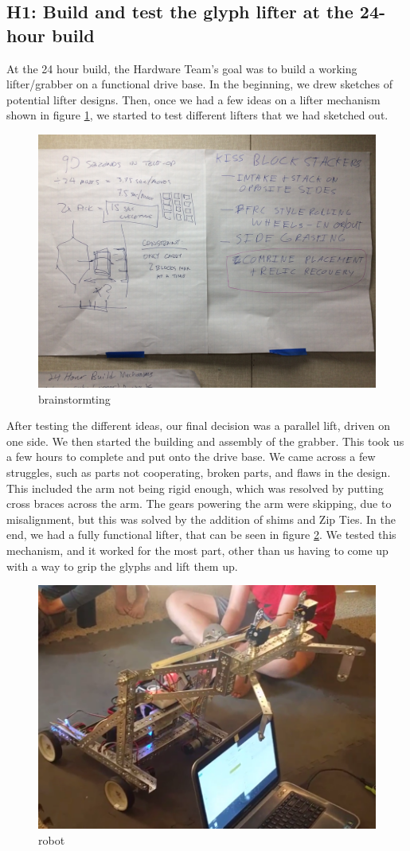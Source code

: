\documentclass{article}
\begin{document}
\subsection{H1: Build and test the glyph lifter at the 24-hour build}

At the 24 hour build, the Hardware Team's goal was to build a working lifter/grabber on a functional drive base. In the beginning, we drew sketches of potential lifter designs. Then, once we had a few ideas on a lifter mechanism shown in figure \ref{fig:brainstorm}, we started to test different lifters that we had sketched out. 
\begin{figure}[h]
    \centering
    \includegraphics[width=.8\textwidth]{01/images/brainstorm.jpg}
    \caption{brainstormting}
    \label{fig:brainstorm}
\end{figure}
After testing the different ideas, our final decision was a parallel lift, driven on one side. We then started the building and assembly of the grabber. This took us a few hours to complete and put onto the drive base. We came across a few struggles, such as parts not cooperating, broken parts, and flaws in the design. This included the arm not being rigid enough, which was resolved by putting cross braces across the arm. The gears powering the arm were skipping, due to misalignment, but this was solved by the addition of shims and Zip Ties. In the end, we had a fully functional lifter, that can be seen in figure \ref{fig:robot}. We tested this mechanism, and it worked for the most part, other than us having to come up with a way to grip the glyphs and lift them up. 
\begin{figure}[h]
    \centering
    \includegraphics[width=.6\textwidth]{01/images/robot.png}
    \caption{robot}
    \label{fig:robot}
\end{figure}
\end{document}
